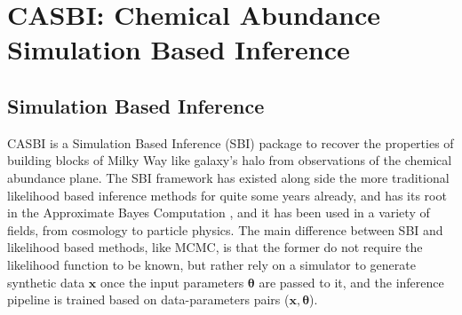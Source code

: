 \chapter{CASBI: Chemical Abundance Simulation Based Inference}

\section{Simulation Based Inference}
CASBI is a Simulation Based Inference (SBI) package to recover the properties of building blocks of Milky Way like galaxy's halo from observations of the chemical abundance plane. The SBI framework has existed along side the more traditional likelihood based inference methods for quite some years already, and has its root in the Approximate Bayes Computation \cite{rubinBayesianlyJustifiableRelevant1984}, and it has been used in a variety of fields, from cosmology to particle physics. The main difference between SBI and likelihood based methods, like MCMC, is that the former do not require the likelihood function to be known, but rather rely on a simulator to generate synthetic data \textbf{$\mathbf{x}$} once the input parameters $\boldsymbol{\theta}$ are passed to it, and the inference pipeline is trained based on data-parameters pairs ($\mathbf{x}, \boldsymbol{\theta}$). 

